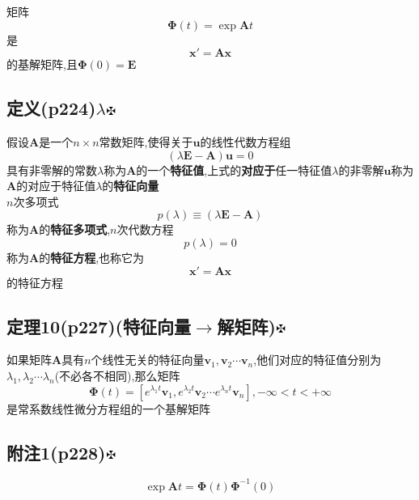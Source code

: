 \documentclass[11pt, a4paper, UTF8]{ctexart}
\begin{document}
矩阵\\
$$\bm{\Phi}(t)=\exp\bm{A}t$$
是\\
$$\bm{x}'=\bm{Ax}$$
的基解矩阵,且$\bm{\Phi}(0)=\bm{E}$\\
\begin{Large}
\section{定义(p224)$\lambda$\protect\hyperlink{catalog}{$\fuck$}}
\end{Large}
假设$\bm{A}$是一个$n\times n$常数矩阵,使得关于$\bm{u}$的线性代数方程组\\
$$(\lambda\bm{E}-\bm{A})\bm u=0$$
具有非零解的常数$\lambda$称为$\bm{A}$的一个\textbf{特征值},上式的\textbf{对应于}任一特征值$\lambda$的非零解$\bm u$称为$\bm A$的对应于特征值$\lambda$的\textbf{特征向量}\\
$n$次多项式\\
$$p(\lambda)\equiv(\lambda\bm E-\bm A)$$
称为$\bm A$的\textbf{特征多项式},$n$次代数方程\\
$$p(\lambda)=0$$
称为$\bm A$的\textbf{特征方程},也称它为\\
$$\bm x'=\bm{Ax}$$
的特征方程\\
\begin{Large}
\section{定理10(p227)(特征向量$\to$解矩阵)\protect\hyperlink{catalog}{$\fuck$}}
\end{Large}
如果矩阵$\bm A$具有$n$个线性无关的特征向量$\bm v_1,\bm v_2\cdots\bm v_n$,他们对应的特征值分别为$\lambda_1,\lambda_2\cdots\lambda_n$(不必各不相同),那么矩阵\\
$$\bm\Phi(t)=[e^{\lambda_1t}\bm v_1,e^{\lambda_2t}\bm v_2\cdots e^{\lambda_nt}\bm v_n],-\infty<t<+\infty$$
是常系数线性微分方程组的一个基解矩阵\\
\begin{Large}
\section{附注1(p228)\protect\hyperlink{catalog}{$\fuck$}}
\end{Large}
$$\exp\bm At=\bm\Phi(t)\bm\Phi^{-1}(0)$$
\end{document}
